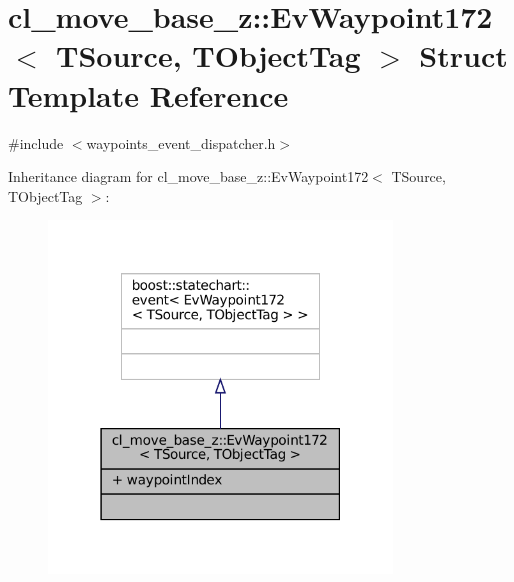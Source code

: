 \hypertarget{structcl__move__base__z_1_1EvWaypoint172}{}\section{cl\+\_\+move\+\_\+base\+\_\+z\+:\+:Ev\+Waypoint172$<$ T\+Source, T\+Object\+Tag $>$ Struct Template Reference}
\label{structcl__move__base__z_1_1EvWaypoint172}


{\ttfamily \#include $<$waypoints\+\_\+event\+\_\+dispatcher.\+h$>$}



Inheritance diagram for cl\+\_\+move\+\_\+base\+\_\+z\+:\+:Ev\+Waypoint172$<$ T\+Source, T\+Object\+Tag $>$\+:
\nopagebreak
\begin{figure}[H]
\begin{center}
\leavevmode
\includegraphics[width=259pt]{structcl__move__base__z_1_1EvWaypoint172__inherit__graph}
\end{center}
\end{figure}


